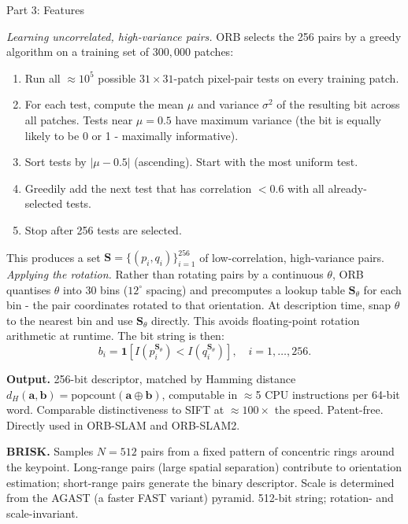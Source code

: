 \documentclass[letterpaper]{article}
\begin{document}
\begin{notes}{Part 3: Features}
\begin{enumerate}
    \emph{Learning uncorrelated, high-variance pairs.} ORB selects the 256 pairs by a greedy algorithm on a training set of $300{,}000$ patches:
    \begin{enumerate}
        \item Run all $\approx10^5$ possible $31\times31$-patch pixel-pair tests on every training patch.
        \item For each test, compute the mean $\mu$ and variance $\sigma^2$ of the resulting bit across all patches. Tests near $\mu=0.5$ have maximum variance (the bit is equally likely to be 0 or 1 - maximally informative).
        \item Sort tests by $|\mu - 0.5|$ (ascending). Start with the most uniform test.
        \item Greedily add the next test that has correlation $< 0.6$ with all already-selected tests.
        \item Stop after 256 tests are selected.
    \end{enumerate}
    This produces a set $\mathbf{S} = \{(p_i, q_i)\}_{i=1}^{256}$ of low-correlation, high-variance pairs.\\
    
    \emph{Applying the rotation.} Rather than rotating pairs by a continuous $\theta$, ORB quantises $\theta$ into 30 bins ($12^\circ$ spacing) and precomputes a lookup table $\mathbf{S}_\theta$ for each bin - the pair coordinates rotated to that orientation. At description time, snap $\theta$ to the nearest bin and use $\mathbf{S}_\theta$ directly. This avoids floating-point rotation arithmetic at runtime. The bit string is then:
    $$b_i = \mathbf{1}\!\left[I\!\left(p_i^{\mathbf{S}_\theta}\right) < I\!\left(q_i^{\mathbf{S}_\theta}\right)\right], \quad i = 1,\dots,256.$$
\end{enumerate}

\textbf{Output.} 256-bit descriptor, matched by Hamming distance $d_H(\mathbf{a},\mathbf{b}) = \mathrm{popcount}(\mathbf{a}\oplus\mathbf{b})$, computable in $\approx$5 CPU instructions per 64-bit word. Comparable distinctiveness to SIFT at $\approx100\times$ the speed. Patent-free. Directly used in ORB-SLAM and ORB-SLAM2.


\textbf{BRISK.} Samples $N=512$ pairs from a fixed pattern of concentric rings around the keypoint. Long-range pairs (large spatial separation) contribute to orientation estimation; short-range pairs generate the binary descriptor. Scale is determined from the AGAST (a faster FAST variant) pyramid. 512-bit string; rotation- and scale-invariant.\\


\end{notes}
\end{document}
